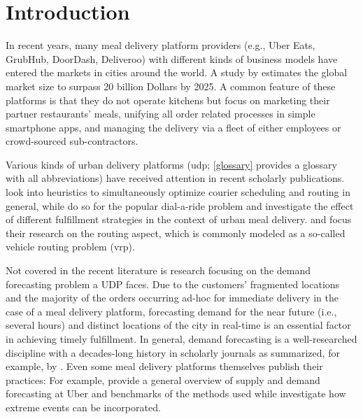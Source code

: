 \section{Introduction}
\label{intro}

In recent years, many meal delivery platform providers (e.g., Uber Eats,
    GrubHub, DoorDash, Deliveroo) with different kinds of business models have
    entered the markets in cities around the world.
A study by \cite{hirschberg2016} estimates the global market size to surpass
    20 billion Dollars by 2025.
A common feature of these platforms is that they do not operate kitchens but
    focus on marketing their partner restaurants' meals, unifying all order
    related processes in simple smartphone apps, and managing the delivery via
    a fleet of either employees or crowd-sourced sub-contractors.

Various kinds of urban delivery platforms
    (\gls{udp}; \ref{glossary} provides a glossary with all abbreviations)
    have received attention in recent scholarly publications.
\cite{hou2018} look into heuristics to simultaneously optimize courier
    scheduling and routing in general, while \cite{masmoudi2018} do so
    for the popular dial-a-ride problem and \cite{wang2018} investigate
    the effect of different fulfillment strategies in the context of urban
    meal delivery.
\cite{ehmke2018} and \cite{alcaraz2019} focus their research on the routing
    aspect, which is commonly modeled as a so-called vehicle routing problem
    (\gls{vrp}).

Not covered in the recent literature is research focusing on the demand
    forecasting problem a UDP faces.
Due to the customers' fragmented locations and the majority of the orders
    occurring ad-hoc for immediate delivery in the case of a meal delivery
    platform, forecasting demand for the near future (i.e., several hours)
    and distinct locations of the city in real-time is an essential factor
    in achieving timely fulfillment.
In general, demand forecasting is a well-researched discipline with a
    decades-long history in scholarly journals as summarized, for example, by
    \cite{de2006}.
Even some meal delivery platforms themselves publish their practices: For
    example, \cite{bell2018} provide a general overview of supply and demand
    forecasting at Uber and benchmarks of the methods used while
    \cite{laptev2017} investigate how extreme events can be incorporated.

